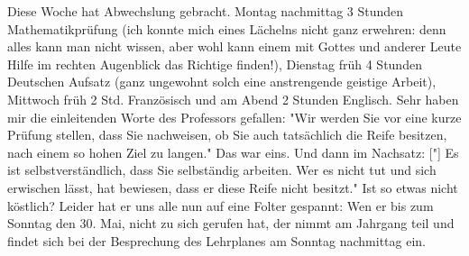 \def\day{27. Mai 1943}
\mktitle

Diese Woche hat Abwechslung gebracht.
Montag nachmittag 3 Stunden Mathematikpr\"{u}fung (ich konnte mich eines L\"{a}chelns nicht ganz erwehren: denn alles kann man nicht wissen, aber wohl kann einem mit Gottes und anderer Leute Hilfe im rechten Augenblick das Richtige finden!), Dienstag fr\"{u}h 4 Stunden Deutschen Aufsatz (ganz ungewohnt solch eine anstrengende geistige Arbeit), Mittwoch fr\"{u}h 2 Std. Franz\"{o}sisch und am Abend 2 Stunden Englisch.
Sehr haben mir die einleitenden Worte des Professors gefallen: "Wir werden Sie vor eine kurze Pr\"{u}fung stellen, dass Sie nachweisen, ob Sie auch tats\"{a}chlich die Reife besitzen, nach einem so hohen Ziel zu langen."
Das war eins.
Und dann im Nachsatz: {\color{red} ["] }Es ist selbstverst\"{a}ndlich, dass Sie selbst\"{a}ndig arbeiten.
Wer es nicht tut und sich erwischen l\"{a}sst, hat bewiesen, dass er diese Reife nicht besitzt."
Ist so etwas nicht k\"{o}stlich?
Leider hat er uns alle nun auf eine Folter gespannt: Wen er bis zum Sonntag den 30. Mai, nicht zu sich gerufen hat, der nimmt am Jahrgang teil und findet sich bei der Besprechung des Lehrplanes am Sonntag nachmittag ein.

\clearpage
